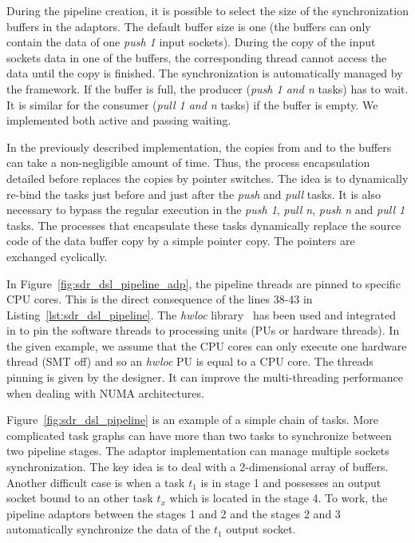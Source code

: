 During the pipeline creation, it is possible to select the size of the
synchronization buffers in the adaptors. The default buffer size is one (the
buffers can only contain the data of one \emph{push 1} input sockets). During
the copy of the input sockets data in one of the buffers, the corresponding
thread cannot access the data until the copy is finished. The synchronization is
automatically managed by the framework. If the buffer is full, the producer
(\emph{push 1 and n} tasks) has to wait. It is similar for the consumer
(\emph{pull 1 and n} tasks) if the buffer is empty. We implemented both active
and passing waiting.

In the previously described implementation, the copies from and to the buffers
can take a non-negligible amount of time. Thus, the process encapsulation
detailed before replaces the copies by pointer switches. The idea is to
dynamically re-bind the tasks just before and just after the \emph{push} and
\emph{pull} tasks. It is also necessary to bypass the regular execution in the
\emph{push 1}, \emph{pull n}, \emph{push n} and \emph{pull 1} tasks. The
processes that encapsulate these tasks dynamically replace the source code of
the data buffer copy by a simple pointer copy. The pointers are exchanged
cyclically.

In Figure~\ref{fig:sdr_dsl_pipeline_adp}, the pipeline threads are pinned to
specific CPU cores. This is the direct consequence of the lines 38-43 in
Listing~\ref{lst:sdr_dsl_pipeline}. The \emph{hwloc}
library~\cite{Broquedis2010} has been used and integrated in \AFFECT to pin the
software threads to processing units (PUs or hardware threads). In the given
example, we assume that the CPU cores can only execute one hardware thread (SMT
off) and so an \emph{hwloc} PU is equal to a CPU core. The threads pinning is
given by the designer. It can improve the multi-threading performance when
dealing with NUMA architectures.

Figure~\ref{fig:sdr_dsl_pipeline} is an example of a simple chain of tasks. More
complicated task graphs can have more than two tasks to synchronize between two
pipeline stages. The adaptor implementation can manage multiple sockets
synchronization. The key idea is to deal with a 2-dimensional array of buffers.
Another difficult case is when a task $t_1$ is in stage 1 and possesses an
output socket bound to an other task $t_{x}$ which is located in the stage 4.
To work, the pipeline adaptors between the stages 1 and 2 and the stages 2 and 3
automatically synchronize the data of the $t_1$ output socket.

